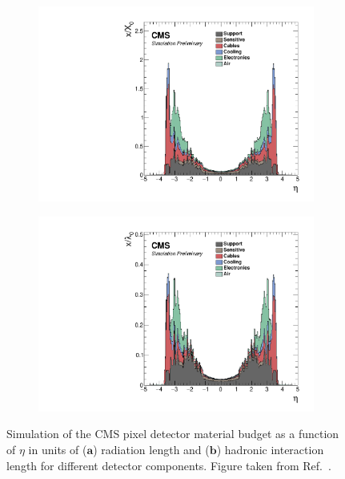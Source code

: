 \begin{figure}[h]
    \centering
    \begin{subfigure}[b]{0.49\textwidth}
        \centering
        \includegraphics[width=\textwidth]{Figures/Chapter3/Material_Budget1.pdf}
        \caption{}
    \end{subfigure}
    \begin{subfigure}[b]{0.49\textwidth}
        \centering
        \includegraphics[width=\textwidth]{Figures/Chapter3/Material_Budget2.pdf}
        \caption{}
    \end{subfigure}
\caption{Simulation of the CMS pixel detector material budget as a function of $\eta$ in units of ($\textbf{a}$) radiation length and ($\textbf{b}$) hadronic interaction length for different detector components. Figure taken from Ref.~\cite{TrackerMaterialBudget_Pixel}.}
\label{Figure:Chapter3_Tracker_MaterialBudget}
\end{figure}


